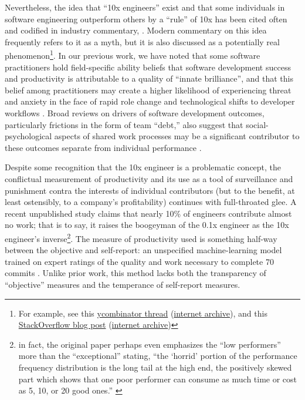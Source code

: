 \documentclass[manuscript,screen,review]{acmart}
\begin{document}
Nevertheless, the idea that ``10x engineers'' exist and that some
individuals in software engineering outperform others by a ``rule'' of
10x has been cited often and codified in industry commentary,
\citep[e.g.,][]{brooksMythicalManmonthEssays1975}. Modern commentary on
this idea frequently refers to it as a myth, but it is also discussed as
a potentially real phenomenon\footnote{For example, see this
  \href{https://news.ycombinator.com/item?id=22349531}{ycombinator
  thread}
  (\href{http://web.archive.org/web/20240917164935/https://stackoverflow.blog/2024/06/19/the-real-10x-developer-makes-their-whole-team-better/}{internet
  archive}), and this
  \href{https://stackoverflow.blog/2024/06/19/the-real-10x-developer-makes-their-whole-team-better}{StackOverflow
  blog post}
  (\href{http://web.archive.org/web/20231209171051/https://news.ycombinator.com/item?id=22349531}{internet
  archive})}. In our previous work, we have noted that some software
practitioners hold field-specific ability beliefs that software
development success and productivity is attributable to a quality of
``innate brilliance'', and that this belief among practitioners may
create a higher likelihood of experiencing threat and anxiety in the
face of rapid role change and technological shifts to developer
workflows \citep{hicksNewDeveloperAI2024}. Broad reviews on drivers of
software development outcomes, particularly frictions in the form of
team ``debt,'' also suggest that social-psychological aspects of shared
work processes may be a significant contributor to these outcomes
separate from individual performance \citep{ahmadPandorasBoxSocial2024}.

Despite some recognition that the 10x engineer is a problematic concept,
the conflictual measurement of productivity and its use as a tool of
surveillance and punishment contra the interests of individual
contributors (but to the benefit, at least ostensibly, to a company's
profitability) continues with full-throated glee. A recent unpublished
study claims that nearly 10\% of engineers contribute almost no work;
that is to say, it raises the boogeyman of the 0.1x engineer as the 10x
engineer's inverse\footnote{in fact, the original paper perhaps even
  emphasizes the ``low performers'' more than the ``exceptional''
  stating, ``the `horrid' portion of the performance frequency
  distribution is the long tail at the high end, the positively skewed
  part which shows that one poor performer can consume as much time or
  cost as 5, 10, or 20 good ones.''
  \citep[6]{sackmanExploratoryExperimentalStudies1968}}\citep{obstbaumOngoingResearchSoftware}.
The measure of productivity used is something half-way between the
objective and self-report: an unspecified machine-learning model trained
on expert ratings of the quality and work necessary to complete 70
commits \citep{denisov-blanchPredictingExpertEvaluations2024}. Unlike
prior work, this method lacks both the transparency of ``objective''
measures and the temperance of self-report measures.
\end{document}
